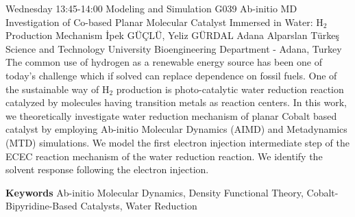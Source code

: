 
    \begin{abstract_basarim}
    {Wednesday 13:45-14:00}
    {Modeling and Simulation}
    {G039}
    {Ab-initio MD Investigation of Co-based Planar Molecular Catalyst Immersed in Water: $\mathrm{H}_{2}$ Production Mechanism}
    {%
    İpek GÜÇLÜ, Yeliz GÜRDAL}
    {%
    }
    {%
    Adana Alparslan Türkeş Science and Technology University Bioengineering Department - Adana, Turkey}
    The common use of hydrogen as a renewable energy source has been one of today's challenge which if solved can replace dependence on fossil fuels. One of the sustainable way of $\mathrm{H}_{2}$ production is photo-catalytic water reduction reaction catalyzed by molecules having transition metals as reaction centers. In this work, we theoretically investigate water reduction mechanism of planar Cobalt based catalyst by employing Ab-initio Molecular Dynamics (AIMD) and Metadynamics (MTD) simulations. We model the first electron injection intermediate step of the ECEC reaction mechanism of the water reduction reaction. We identify the solvent response following the electron injection. 
    
        \textbf{Keywords} \newline{}Ab-initio Molecular Dynamics, Density Functional Theory, Cobalt-Bipyridine-Based Catalysts, Water Reduction
    \end{abstract_basarim}
    